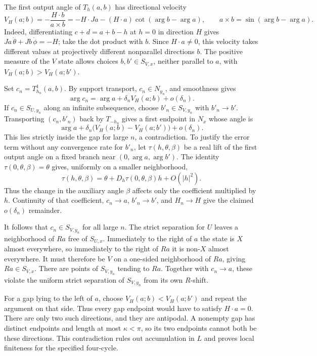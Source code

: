 The first output angle of $T_h(a,b)$ has directional velocity
\[
 V_H(a;b)=-\frac{H\cdot b}{a\times b}
   =-H\cdot Ja-(H\cdot a)\cot(\arg b-\arg a),
 \qquad a\times b=\sin(\arg b-\arg a).
\]
Indeed, differentiating $c+d=a+b-h$ at $h=0$ in direction $H$ gives
$Ja\,\dot\theta+Jb\,\dot\phi=-H$; take the dot product with $b$.
Since $H\cdot a\ne0$, this velocity takes different values at
projectively different nonparallel directions $b$.  The positive
measure of the $V$ state allows choices $b,b'\in S_{V,x}$, neither
parallel to $a$, with $V_H(a;b)>V_H(a;b')$.

Set $c_n=T_{h_n}^{1}(a,b)$.  By support transport, $c_n\in N_{y_n}$,
and smoothness gives
\[
 \arg c_n=\arg a+\delta_n V_H(a;b)+o(\delta_n).
\]
If $c_n\in S_{U,y_n}$ along an infinite subsequence, choose
$b'_n\in S_{V,y_n}$ with $b'_n\to b'$.  Transporting
$(c_n,b'_n)$ back by $T_{-h_n}$ gives a first endpoint in $N_x$
whose angle is
\[
 \arg a+\delta_n\bigl(V_H(a;b)-V_H(a;b')\bigr)+o(\delta_n).
\]
This lies strictly inside the gap for large $n$, a contradiction.
To justify the error term without any convergence rate for $b'_n$,
let $\tau(h,\theta,\beta)$ be a real lift of the first output angle
on a fixed branch near $(0,\arg a,\arg b')$.  The identity
$\tau(0,\theta,\beta)=\theta$ gives, uniformly on a smaller
neighborhood,
\[
 \tau(h,\theta,\beta)
    =\theta+D_h\tau(0,\theta,\beta)h+O(|h|^2).
\]
Thus the change in the auxiliary angle $\beta$ affects only the
coefficient multiplied by $h$.  Continuity of that coefficient,
$c_n\to a$, $b'_n\to b'$, and $H_n\to H$ give the claimed
$o(\delta_n)$ remainder.

It follows that $c_n\in S_{V,y_n}$ for all large $n$.  The strict
separation for $U$ leaves a neighborhood of $Ra$ free of $S_{U,x}$.
Immediately to the right of $a$ the state is $X$ almost everywhere,
so immediately to the right of $Ra$ it is non-$X$ almost everywhere.
It must therefore be $V$ on a one-sided neighborhood of $Ra$, giving
$Ra\in S_{V,x}$.  There are points of $S_{V,y_n}$ tending to $Ra$.
Together with $c_n\to a$, these violate the uniform strict separation
of $S_{V,y_n}$ from its own $R$-shift.

For a gap lying to the left of $a$, choose
$V_H(a;b)<V_H(a;b')$ and repeat the argument on that side.  Thus
every gap endpoint would have to satisfy $H\cdot a=0$.  There are
only two such directions, and they are antipodal.  A nonempty gap
has distinct endpoints and length at most $\kappa<\pi$, so its two
endpoints cannot both be these directions.  This contradiction
rules out accumulation in $L$ and proves local finiteness for the
specified four-cycle.

